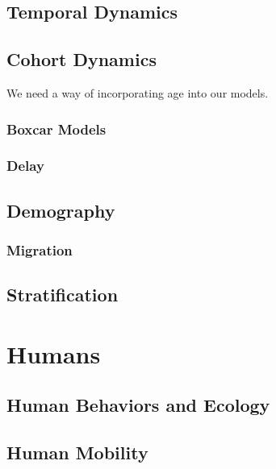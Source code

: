\documentclass[
]{book}
\begin{document}
\hypertarget{temporal-dynamics}{%
\chapter{Temporal Dynamics}\label{temporal-dynamics}}

\hypertarget{cohort-dynamics}{%
\chapter{Cohort Dynamics}\label{cohort-dynamics}}

We need a way of incorporating age into our models.

\hypertarget{boxcar-models}{%
\section{Boxcar Models}\label{boxcar-models}}

\hypertarget{delay}{%
\section{Delay}\label{delay}}

\hypertarget{demography}{%
\chapter{Demography}\label{demography}}

\hypertarget{migration}{%
\section{Migration}\label{migration}}

\hypertarget{stratification-1}{%
\chapter{Stratification}\label{stratification-1}}

\hypertarget{part-humans}{%
\part{Humans}\label{part-humans}}

\hypertarget{human-behaviors-and-ecology}{%
\chapter{Human Behaviors and Ecology}\label{human-behaviors-and-ecology}}

\hypertarget{human-mobility}{%
\chapter{Human Mobility}\label{human-mobility}}
\end{document}
